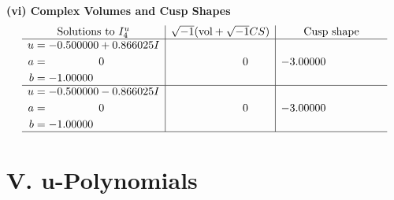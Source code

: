 \documentclass[1p]{elsarticle_modified}
\theoremstyle{definition}
\newcommand{\I}{\sqrt{-1}}
\begin{document}
\newpage\flushleft \textbf{(vi) Complex Volumes and Cusp Shapes}
$$\begin{array}{c|c|c}  
\text{Solutions to }I^u_{4}& \I (\text{vol} + \sqrt{-1}CS) & \text{Cusp shape}\\
 \hline 
\begin{aligned}
u &= -0.500000 + 0.866025 I \\
a &= \phantom{-0.000000 } 0 \\
b &= -1.00000\phantom{ +0.000000I}\end{aligned}
 & \phantom{-0.000000 } 0 & -3.00000\phantom{ +0.000000I} \\ \hline\begin{aligned}
u &= -0.500000 - 0.866025 I \\
a &= \phantom{-0.000000 } 0 \\
b &= -1.00000\phantom{ +0.000000I}\end{aligned}
 & \phantom{-0.000000 } 0 & -3.00000\phantom{ +0.000000I}\\
 \hline 
 \end{array}$$\newpage
\newpage\renewcommand{\arraystretch}{1}
\centering \section*{ V. u-Polynomials}
\end{document}
